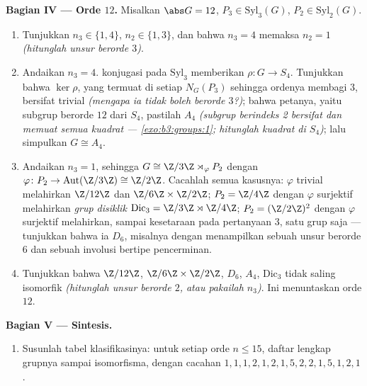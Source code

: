 \begin{problem}
\medskip
\noindent\textbf{Bagian IV --- Orde $12$.} Misalkan $\abs G = 12$, $P_3
\in \mathrm{Syl}_3(G)$, $P_2 \in \mathrm{Syl}_2(G)$.
\begin{enumerate}[resume]
  \item Tunjukkan $n_3 \in \{1, 4\}$, $n_2 \in \{1, 3\}$, dan bahwa $n_3
        = 4$ memaksa $n_2 = 1$ \emph{(hitunglah unsur berorde
        $3$)}.
  \item Andaikan $n_3 = 4$.  konjugasi pada
        $\mathrm{Syl}_3$ memberikan $\rho \colon G \to S_4$. Tunjukkan bahwa
        $\ker \rho$, yang termuat di setiap $N_G(P_3)$ sehingga
        ordenya membagi $3$, bersifat trivial \emph{(mengapa ia tidak boleh
        berorde $3$?)}; bahwa petanya, yaitu subgrup berorde $12$ dari
        $S_4$, pastilah $A_4$ \emph{(subgrup berindeks 2 bersifat
         dan memuat semua kuadrat ---
        \cref{exo:b3:groups:1}; hitunglah kuadrat di $S_4$)}; lalu
        simpulkan $G \cong A_4$.
  \item Andaikan $n_3 = 1$, sehingga $G \cong \Z/3\Z \rtimes_\varphi P_2$
        dengan $\varphi \colon P_2 \to \operatorname{Aut}(\Z/3\Z)
        \cong \Z/2\Z$. Cacahlah semua kasusnya: $\varphi$ trivial
        melahirkan $\Z/12\Z$ dan $\Z/6\Z \times \Z/2\Z$; $P_2 =
        \Z/4\Z$ dengan $\varphi$ surjektif melahirkan
        \emph{grup disiklik} $\mathrm{Dic}_3 = \Z/3\Z \rtimes
        \Z/4\Z$; $P_2 = (\Z/2\Z)^2$ dengan $\varphi$ surjektif
        melahirkan, sampai kesetaraan pada pertanyaan 3, satu
        grup saja --- tunjukkan bahwa ia $D_6$, misalnya dengan menampilkan sebuah unsur
        berorde $6$ dan sebuah involusi bertipe pencerminan.
  \item Tunjukkan bahwa $\Z/12\Z$, $\Z/6\Z \times \Z/2\Z$, $D_6$, $A_4$,
        $\mathrm{Dic}_3$ tidak saling isomorfik \emph{(hitunglah
        unsur berorde $2$, atau pakailah $n_3$)}. Ini menuntaskan orde
        $12$.
\end{enumerate}

\medskip
\noindent\textbf{Bagian V --- Sintesis.}
\begin{enumerate}[resume]
  \item Susunlah tabel klasifikasinya: untuk setiap orde $n \leq
        15$, daftar lengkap grupnya sampai isomorfisma, dengan
        cacahan $1, 1, 1, 2, 1, 2, 1, 5, 2, 2, 1, 5, 1, 2, 1$.
\end{enumerate}


\end{problem}
